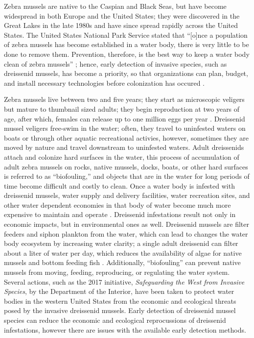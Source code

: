\documentclass[12pt]{article}\usepackage[]{graphicx}\usepackage[]{color}
\begin{document}
Zebra mussels are native to the Caspian and Black Seas, but have become widespread in both Europe and the United States; they were discovered in the Great Lakes in the late 1980s and have since spread rapidly across the United States. The United States National Park Service stated that ``[o]nce a population of zebra mussels has become established in a water body, there is very little to be done to remove them. Prevention, therefore, is the best way to keep a water body clean of zebra mussels'' \cite{NPS}; hence, early detection of invasive species, such as dreissenid mussels, has become a priority, so that organizations can plan, budget, and install necessary technologies before colonization has occured \cite{Holser:body}. 

Zebra mussels live between two and five years; they start as microscopic veligers but mature to thumbnail sized adults; they begin reproduction at two years of age, after which, females can release up to one million eggs per year \cite{NPS}. Dreissenid mussel veligers free-swim in the water; often, they travel to uninfested waters on boats or through other aquatic recreational activies, however, sometimes they are moved by nature and travel downstream to uninfested waters. Adult dreissenids attach and colonize hard surfaces in the water, this process of accumulation of adult zebra mussels on rocks, native mussels, docks, boats, or other hard surfaces is referred to as ``biofouling,'' and objects that are in the water for long periods of time become difficult and costly to clean. Once a water body is infested with dreissenid mussels, water supply and delivery facilities, water recreation sites, and other water dependent economies in that body of water become much more expensive to maintain and operate \cite{BOR}. Dreissenid infestations result not only in economic impacts, but in environmental ones as well. Dreissenid mussels are filter feeders and siphon plankton from the water, which can lead to changes the water body ecosystem by increasing water clarity; a single adult dreissenid can filter about a liter of water per day, which reduces the availability of algae for native mussels and bottom feeding fish \cite{BOR}. Additionally, ``biofouling'' can prevent native mussels from moving, feeding, reproducing, or regulating the water system. Several actions, such as the 2017 initiative, \textit{Safeguarding the West from Invasive Species}, by the Department of the Interior, have been taken to protect water bodies in the western United States from the economic and ecological threats posed by the invasive dreissenid mussels. Early detection of dreissenid mussel species can reduce the economic and ecological reprocussions of dreissenid infestations, however there are issues with the available early detection methods. 
\end{document}
